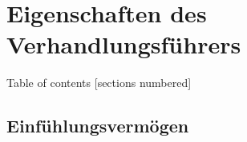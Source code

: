 
\section{Eigenschaften des Verhandlungsführers}


\begin{frame}{Table of contents}
  [sections numbered]
  \tableofcontents
\end{frame}

\subsection{Einfühlungsvermögen}

\begin{frame}
  \begin{framed}
  \end{framed}
\end{frame}


